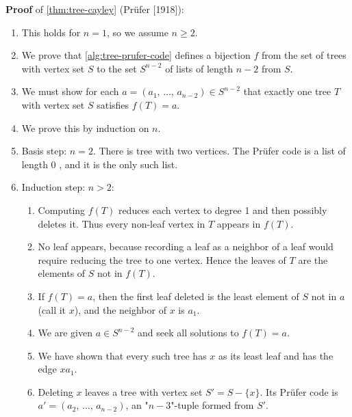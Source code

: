 \documentclass[../src/handouts/main.tex]{subfiles}
\begin{document}
\textbf{Proof} of \cref{thm:tree-cayley} (Prüfer [1918]):
\begin{enumerate}
  \item This holds for $n = 1$, so we assume $n \geq 2$.
  \item We prove that \cref{alg:tree-prufer-code} defines a bijection $f$ from the set of trees with vertex set $S$ to the set $S^{n - 2}$ of lists of length $n - 2$ from $S$.
  \item We must show for each $a = \left(a_1,\, \ldots,\, a_{n - 2}\right) \in S^{n - 2}$ that exactly one tree $T$ with vertex set $S$ satisfies $f(T) = a$.
  \item We prove this by induction on $n$.
  \item Basis step: $n = 2$. There is tree with two vertices. The Prüfer code is a list of length 0 , and it is the only such list.
  \item Induction step: $n > 2$:
    \begin{enumerate}
      \item Computing $f(T)$ reduces each vertex to degree 1 and then possibly deletes it. Thus every non-leaf vertex in $T$ appears in $f(T)$.
      \item No leaf appears, because recording a leaf as a neighbor of a leaf would require reducing the tree to one vertex. Hence the leaves of $T$ are the elements of $S$ not in $f(T)$.
      \item If $f(T) = a$, then the first leaf deleted is the least element of $S$ not in $a$ (call it $x$), and the neighbor of $x$ is $a_1$.
      \item We are given $a \in S^{n - 2}$ and seek all solutions to $f(T)=a$.
      \item We have shown that every such tree has $x$ as its least leaf and has the edge $x a_1$.
      \item Deleting $x$ leaves a tree with vertex set $S' = S - \{x\}$. Its Prüfer code is $a' = \left( a_2,\, \ldots,\, a_{n - 2} \right)$, an "$n - 3$"-tuple formed from $S'$.
    \end{enumerate}
\end{enumerate}
\end{document}
